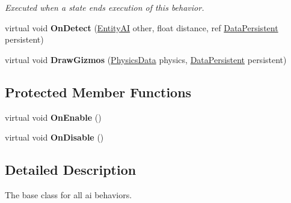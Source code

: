 \begin{DoxyCompactItemize}
\begin{DoxyCompactList}\small\item\em Executed when a state ends execution of this behavior. \end{DoxyCompactList}\item 
\hypertarget{class_skyrates_1_1_a_i_1_1_behavior_a2704415e526d56f7e779d8d8b1144453}{virtual void {\bfseries On\-Detect} (\hyperlink{class_skyrates_1_1_entity_1_1_entity_a_i}{Entity\-A\-I} other, float distance, ref \hyperlink{class_skyrates_1_1_a_i_1_1_behavior_1_1_data_persistent}{Data\-Persistent} persistent)}\label{class_skyrates_1_1_a_i_1_1_behavior_a2704415e526d56f7e779d8d8b1144453}

\item 
\hypertarget{class_skyrates_1_1_a_i_1_1_behavior_a2a6c504545a955ba1b585ca1228953ae}{virtual void {\bfseries Draw\-Gizmos} (\hyperlink{class_skyrates_1_1_physics_1_1_physics_data}{Physics\-Data} physics, \hyperlink{class_skyrates_1_1_a_i_1_1_behavior_1_1_data_persistent}{Data\-Persistent} persistent)}\label{class_skyrates_1_1_a_i_1_1_behavior_a2a6c504545a955ba1b585ca1228953ae}

\end{DoxyCompactItemize}
\subsection*{Protected Member Functions}
\begin{DoxyCompactItemize}
\item 
\hypertarget{class_skyrates_1_1_a_i_1_1_behavior_aa5ff5ea024bc0c55d5b9841dc77da9b5}{virtual void {\bfseries On\-Enable} ()}\label{class_skyrates_1_1_a_i_1_1_behavior_aa5ff5ea024bc0c55d5b9841dc77da9b5}

\item 
\hypertarget{class_skyrates_1_1_a_i_1_1_behavior_a0d03946e9a1233f5930213133bda11f5}{virtual void {\bfseries On\-Disable} ()}\label{class_skyrates_1_1_a_i_1_1_behavior_a0d03946e9a1233f5930213133bda11f5}

\end{DoxyCompactItemize}


\subsection{Detailed Description}
The base class for all ai behaviors. 



